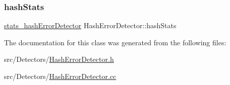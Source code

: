\subsubsection{\texorpdfstring{hash\+Stats}{hashStats}}
{\footnotesize\ttfamily \hyperlink{HashErrorDetector_8h_afcf148bcfe372c25deda29220815b9e0}{stats\+\_\+hash\+Error\+Detector} Hash\+Error\+Detector\+::hash\+Stats\hspace{0.3cm}{\ttfamily [private]}}



The documentation for this class was generated from the following files\+:\begin{DoxyCompactItemize}
\item 
src/\+Detectors/\hyperlink{HashErrorDetector_8h}{Hash\+Error\+Detector.\+h}\item 
src/\+Detectors/\hyperlink{HashErrorDetector_8cc}{Hash\+Error\+Detector.\+cc}\end{DoxyCompactItemize}
